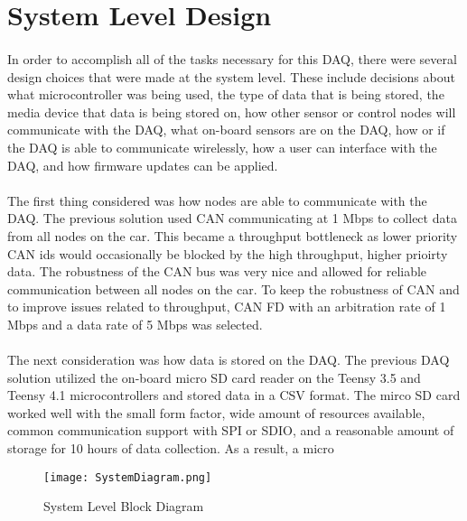 \section{System Level Design}

\paragraph{}
In order to accomplish all of the tasks necessary for this DAQ, there were several design choices that were made at the system level.
These include decisions about what microcontroller was being used, the type of data that is being stored, the media device that data is being stored on, how other sensor or control nodes will communicate with the DAQ, what on-board sensors are on the DAQ, how or if the DAQ is able to communicate wirelessly, how a user can interface with the DAQ, and how firmware updates can be applied.

\paragraph{}
The first thing considered was how nodes are able to communicate with the DAQ.
The previous solution used CAN communicating at 1 Mbps to collect data from all nodes on the car.
This became a throughput bottleneck as lower priority CAN ids would occasionally be blocked by the high throughput, higher prioirty data.
The robustness of the CAN bus was very nice and allowed for reliable communication between all nodes on the car.
To keep the robustness of CAN and to improve issues related to throughput, CAN FD with an arbitration rate of 1 Mbps and a data rate of 5 Mbps was selected.

\paragraph{}
The next consideration was how data is stored on the DAQ.
The previous DAQ solution utilized the on-board micro SD card reader on the Teensy 3.5 and Teensy 4.1 microcontrollers and stored data in a CSV format.
The mirco SD card worked well with the small form factor, wide amount of resources available, common communication support with SPI or SDIO, and a reasonable amount of storage for 10 hours of data collection.
As a result, a micro

\begin{figure}[H]
	\centering
	\texttt{[image: SystemDiagram.png]}
	\caption{System Level Block Diagram}
	\label{fig:SysDiagram}
\end{figure}